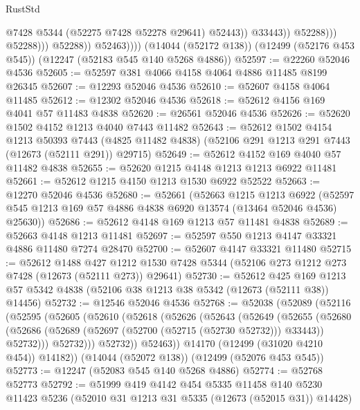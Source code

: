 \begin{lexlean}{RustStd}
\begin{coremodule}
{\begin{coremodule}
{{{{{{{{{{{{{{{{{{{{{{{{{{{{{{{{{{{{{{{{{{{{{{{{{{{{{{{{{{{{{{{{{{{{{{{{{{{{{{{{                                    @7428
                                    @5344
                                    (@52275 @7428 @52278 @29641)
                                    @52443))
                                @33443))
                            @52288)))
                      @52288)))
                @52288))
            @52463))))
    (@14044 (@52172 @138))
    (@12499 (@52176 @453 @545))
    (@12247 (@52183 @545 @140 @5268 @4886))
@52597 := @22260 @52046 @4536
@52605 := @52597 @381 @4066 @4158 @4064 @4886 @11485 @8199 @26345
@52607 := @12293 @52046 @4536
@52610 := @52607 @4158 @4064 @11485
@52612 := @12302 @52046 @4536
@52618 := @52612 @4156 @169 @4041 @57 @11483 @4838
@52620 := @26561 @52046 @4536
@52626 := @52620 @1502 @4152 @1213 @4040 @7443 @11482
@52643 := @52612
    @1502
    @4154
    @1213
    @50393
    @7443
    (@4825 @11482 @4838)
    (@52106 @291 @1213 @291 @7443 (@12673 (@52111 @291)) @29715)
@52649 := @52612 @4152 @169 @4040 @57 @11482 @4838
@52655 := @52620 @1215 @4148 @1213 @1213 @6922 @11481
@52661 := @52612 @1215 @4150 @1213 @1530 @6922 @52522
@52663 := @12270 @52046 @4536
@52680 := @52661
    (@52663
      @1215
      @1213
      @6922
      (@52597 @545 @1213 @169 @57 @4886 @4838 @6920 @13574 (@13464 @52046 @4536) @25630))
@52686 := @52612 @4148 @169 @1213 @57 @11481 @4838
@52689 := @52663 @4148 @1213 @11481
@52697 := @52597 @550 @1213 @4147 @33321 @4886 @11480 @7274 @28470
@52700 := @52607 @4147 @33321 @11480
@52715 := @52612
    @1488
    @427
    @1212
    @1530
    @7428
    @5344
    (@52106 @273 @1212 @273 @7428 (@12673 (@52111 @273)) @29641)
@52730 := @52612
    @425
    @169
    @1213
    @57
    @5342
    @4838
    (@52106 @38 @1213 @38 @5342 (@12673 (@52111 @38)) @14456)
@52732 := @12546 @52046 @4536
@52768 := @52038
    (@52089
      (@52116
        (@52595
          (@52605
            (@52610
              (@52618
                (@52626
                  (@52643
                    (@52649
                      (@52655
                        (@52680
                          (@52686
                            (@52689 (@52697 (@52700 (@52715 (@52730 @52732))) @33443))
                            @52732)))
                      @52732)))
                @52732))
            @52463))
        @14170
        (@12499 (@31020 @4210 @454))
        @14182))
    (@14044 (@52072 @138))
    (@12499 (@52076 @453 @545))
@52773 := @12247 (@52083 @545 @140 @5268 @4886)
@52774 := @52768 @52773
@52792 := @51999
    @419
    @4142
    @454
    @5335
    @11458
    @140
    @5230
    @11423
    @5236
    (@52010 @31 @1213 @31 @5335 (@12673 (@52015 @31)) @14428)
}}}}}}}}}}}}}}}}}}}}}}}}}}}}}}}}}}}}}}}}}}}}}}}}}}}}}}}}}}}}}}}}}}}}}}}}}}}}}}}}
\end{coremodule}}
\end{coremodule}
\end{lexlean}
